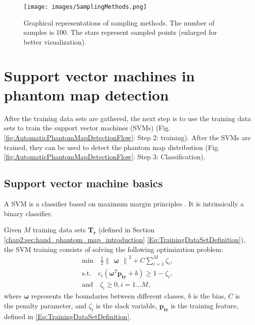 \begin{figure}[ht]
    \centering
    \texttt{[image: images/SamplingMethods.png]}
    \caption{Graphical representations of sampling methods. The number of samples is 100. The stars represent sampled points (enlarged for better visualization). }
    \label{Fig:Sampling_methods}
\end{figure}



\section{Support vector machines in phantom map detection}
\label{chap2:sec:support_vector_machines_in_phantom_map_detection}
After the training data sets are gathered, the next step is to use the training data sets to train the support vector machines (SVMs) (Fig. \ref{fig:AutomaticPhantomMapDetectionFlow}: Step 2: training). After the SVMs are trained, they can be used to detect the phantom map distribution (Fig. \ref{fig:AutomaticPhantomMapDetectionFlow}: Step 3: Classification).

\subsection{Support vector machine basics}
\label{chap2:subsec:supoort_vector_machine_basics}
A SVM is a classifier based on maximum margin principles \cite{bartlett1999generalization}. It is intrinsically a binary classifier. 

Given $M$ training data sets $ \mathbf{T_r}$ (defined in Section \ref{chap2:sec:hand_phantom_map_introduction} \eqref{Eq:TrainingDataSetDefinition}), the SVM training consists of solving the following optimization problem:
\begin{equation}
\label{Eq:dualSVM}
  \begin{aligned}
   \text{min}   \quad   \frac{1}{2} \begin{Vmatrix} \boldsymbol{ \omega}   \end{Vmatrix} ^2 + C \sum_{i=1}^{M} \zeta_{i}, \\
    \text{s.t.}   \quad   c_i(\boldsymbol{\omega} ^T\boldsymbol{ p_{\text{tr}}} + b) \geq 1 -\zeta_i,   \\
     \text{and}  \quad      \zeta _i \geq 0, i = 1 \dots M,
    \end{aligned}
\end{equation}
where $\boldsymbol{\omega}$ represents the boundaries between different classes, $b$ is the bias, $C$ is the penalty parameter, and $\zeta_i$ is the slack variable, $\boldsymbol{ p_{\text{tr}}}$ is the training feature, defined in \eqref{Eq:TrainingDataSetDefinition}.

